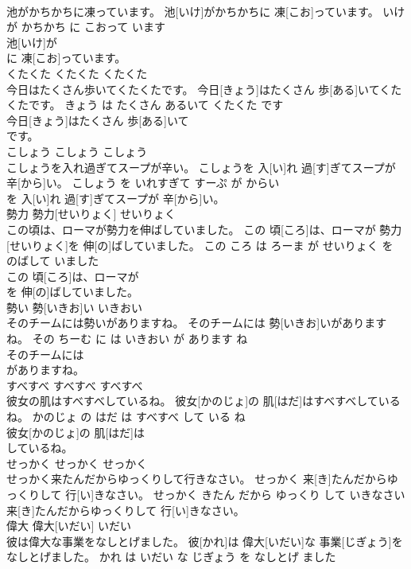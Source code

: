 \documentclass[8pt]{extreport}
\begin{document}
\begin{CJK}{UTF8}{min}
\\	池がかちかちに凍っています。	池[いけ]がかちかちに 凍[こお]っています。	いけ が かちかち に こおって います	
\\	池[いけ]が
\\	に 凍[こお]っています。			
\\	くたくた	くたくた	くたくた	
\\	今日はたくさん歩いてくたくたです。	今日[きょう]はたくさん 歩[ある]いてくたくたです。	きょう は たくさん あるいて くたくた です	
\\	今日[きょう]はたくさん 歩[ある]いて
\\	です。			
\\	こしょう	こしょう	こしょう	
\\	こしょうを入れ過ぎてスープが辛い。	こしょうを 入[い]れ 過[す]ぎてスープが 辛[から]い。	こしょう を いれすぎて すーぷ が からい	
\\	を 入[い]れ 過[す]ぎてスープが 辛[から]い。			
\\	勢力	勢力[せいりょく]	せいりょく	
\\	この頃は、ローマが勢力を伸ばしていました。	この 頃[ころ]は、ローマが 勢力[せいりょく]を 伸[の]ばしていました。	この ころ は ろーま が せいりょく を のばして いました	
\\	この 頃[ころ]は、ローマが
\\	を 伸[の]ばしていました。			
\\	勢い	勢[いきお]い	いきおい	
\\	そのチームには勢いがありますね。	そのチームには 勢[いきお]いがありますね。	その ちーむ に は いきおい が あります ね	
\\	そのチームには
\\	がありますね。			
\\	すべすべ	すべすべ	すべすべ	
\\	彼女の肌はすべすべしているね。	彼女[かのじょ]の 肌[はだ]はすべすべしているね。	かのじょ の はだ は すべすべ して いる ね	
\\	彼女[かのじょ]の 肌[はだ]は
\\	しているね。			
\\	せっかく	せっかく	せっかく	
\\	せっかく来たんだからゆっくりして行きなさい。	せっかく 来[き]たんだからゆっくりして 行[い]きなさい。	せっかく きたん だから ゆっくり して いきなさい	
\\	来[き]たんだからゆっくりして 行[い]きなさい。			
\\	偉大	偉大[いだい]	いだい	
\\	彼は偉大な事業をなしとげました。	彼[かれ]は 偉大[いだい]な 事業[じぎょう]をなしとげました。	かれ は いだい な じぎょう を なしとげ ました	

\end{CJK}
\end{document}
